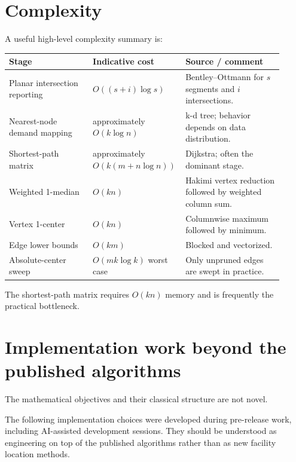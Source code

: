 \documentclass[11pt]{article}
\begin{document}
\section{Complexity}

A useful high-level complexity summary is:

\begin{center}
\begin{tabular}{p{0.30\linewidth}p{0.26\linewidth}p{0.35\linewidth}}
\toprule
\textbf{Stage} & \textbf{Indicative cost} & \textbf{Source / comment} \\
\midrule

Planar intersection reporting
&
\(O((s+i)\log s)\)
&
Bentley--Ottmann for \(s\) segments and \(i\) intersections.
\\

Nearest-node demand mapping
&
approximately \(O(k\log n)\)
&
k-d tree; behavior depends on data distribution.
\\

Shortest-path matrix
&
approximately \(O(k(m+n\log n))\)
&
Dijkstra; often the dominant stage.
\\

Weighted 1-median
&
\(O(kn)\)
&
Hakimi vertex reduction followed by weighted column sum.
\\

Vertex 1-center
&
\(O(kn)\)
&
Columnwise maximum followed by minimum.
\\

Edge lower bounds
&
\(O(km)\)
&
Blocked and vectorized.
\\

Absolute-center sweep
&
\(O(mk\log k)\) worst case
&
Only unpruned edges are swept in practice.
\\

\bottomrule
\end{tabular}
\end{center}

The shortest-path matrix requires \(O(kn)\) memory and is frequently the
practical bottleneck.

\section{Implementation work beyond the published algorithms}

The mathematical objectives and their classical structure are not novel.

The following implementation choices were developed during pre-release work,
including AI-assisted development sessions. They should be understood as
engineering on top of the published algorithms rather than as new facility
location methods.
\end{document}
